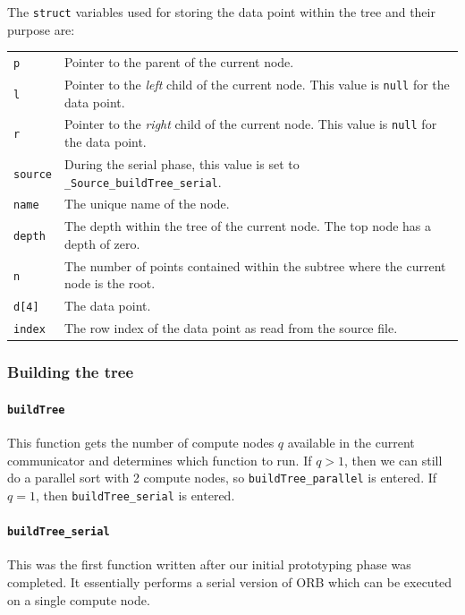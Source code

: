 \documentclass{article}
\begin{document}
The \texttt{struct} variables used for storing the data point within the tree and their purpose are:

\begin{tabular}{l l}
 \texttt{p} & Pointer to the parent of the current node.  \\
 \texttt{l} & Pointer to the \textit{left} child of the current node. This value is \texttt{null} for the data point.  \\
 \texttt{r} & Pointer to the \textit{right} child of the current node. This value is \texttt{null} for the data point.  \\
 \texttt{source} & During the serial phase, this value is set to \texttt{\_Source\_buildTree\_serial}.  \\
 \texttt{name} & The unique name of the node.  \\
 \texttt{depth} & The depth within the tree of the current node. The top node has a depth of zero.  \\
 \texttt{n} & The number of points contained within the subtree where the current node is the root.  \\
 \texttt{d[4]} & The data point.  \\
 \texttt{index} & The row index of the data point as read from the source file.  \\
 \end{tabular}


%
%

\subsubsection{Building the tree}

\paragraph{\texttt{buildTree}}
This function gets the number of compute nodes $q$ available in the current communicator and determines which function to run. If $q>1$, then we can still do a parallel sort with 2 compute nodes, so \texttt{buildTree\_parallel} is entered. If $q=1$, then \texttt{buildTree\_serial} is entered.


%
%

\paragraph{\texttt{buildTree\_serial}}
This was the first function written after our initial prototyping phase was completed. It essentially performs a serial version of ORB which can be executed on a single compute node.
\end{document}
